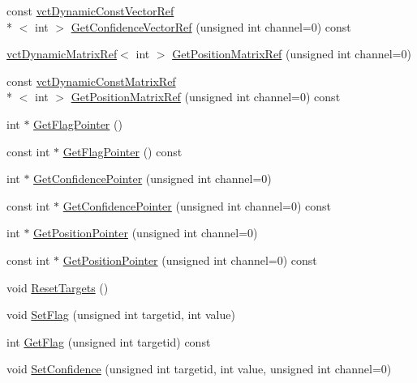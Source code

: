 \begin{DoxyCompactItemize}
\item 
const \hyperlink{classvct_dynamic_const_vector_ref}{vct\-Dynamic\-Const\-Vector\-Ref}\\*
$<$ int $>$ \hyperlink{classsvl_sample_targets_a3236346e68eab08a762efbcf0e0350b8}{Get\-Confidence\-Vector\-Ref} (unsigned int channel=0) const 
\item 
\hyperlink{classvct_dynamic_matrix_ref}{vct\-Dynamic\-Matrix\-Ref}$<$ int $>$ \hyperlink{classsvl_sample_targets_a8b8d9ccac7265de45c308dbbfc1eb757}{Get\-Position\-Matrix\-Ref} (unsigned int channel=0)
\item 
const \hyperlink{classvct_dynamic_const_matrix_ref}{vct\-Dynamic\-Const\-Matrix\-Ref}\\*
$<$ int $>$ \hyperlink{classsvl_sample_targets_a9a77f72f0df2318ecb9aa9b2968c354a}{Get\-Position\-Matrix\-Ref} (unsigned int channel=0) const 
\item 
int $\ast$ \hyperlink{classsvl_sample_targets_a509bb541dd2840e20840ec4911ba1cb1}{Get\-Flag\-Pointer} ()
\item 
const int $\ast$ \hyperlink{classsvl_sample_targets_a3ad17166082ba970af9dd8313e63c827}{Get\-Flag\-Pointer} () const 
\item 
int $\ast$ \hyperlink{classsvl_sample_targets_a67205065691030b0e9c71aa025bc8141}{Get\-Confidence\-Pointer} (unsigned int channel=0)
\item 
const int $\ast$ \hyperlink{classsvl_sample_targets_a9a135aafd97bc84c10b85619dcbea7fc}{Get\-Confidence\-Pointer} (unsigned int channel=0) const 
\item 
int $\ast$ \hyperlink{classsvl_sample_targets_ad830943cfaba38deeb2b208bfd2826a7}{Get\-Position\-Pointer} (unsigned int channel=0)
\item 
const int $\ast$ \hyperlink{classsvl_sample_targets_ae976f2dfc186374e7a25d592a3c58037}{Get\-Position\-Pointer} (unsigned int channel=0) const 
\item 
void \hyperlink{classsvl_sample_targets_a5a552abb25e9e49a006b46cfba856610}{Reset\-Targets} ()
\item 
void \hyperlink{classsvl_sample_targets_a71356a8ccd8914048eda4db73c70e5bb}{Set\-Flag} (unsigned int targetid, int value)
\item 
int \hyperlink{classsvl_sample_targets_ad04b0134904188c5798bdac2e941b3a6}{Get\-Flag} (unsigned int targetid) const 
\item 
void \hyperlink{classsvl_sample_targets_a164f27c75f7495c69b21a0aebe113296}{Set\-Confidence} (unsigned int targetid, int value, unsigned int channel=0)

\end{DoxyCompactItemize}
